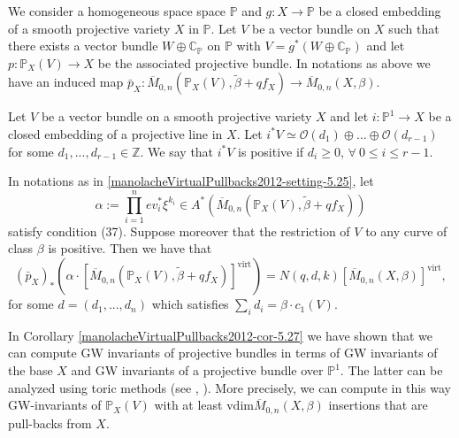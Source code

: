 \begin{setting}\label{manolacheVirtualPullbacks2012-setting-5.25}
\label{manolacheVirtualPullbacks2012-notatii}We consider a homogeneous space space $\mathbb{P}$ and $g:X\to\mathbb{P}$ be a closed embedding of a smooth projective variety $X$ in $\mathbb{P}$. Let $V$ be a vector bundle on $X$ such that there exists a vector bundle $W\oplus \mathbb{C}_{\mathbb{P}}$ on $\mathbb{P}$ with $V=g^*(W\oplus \mathbb{C}_{\mathbb{P}})$ and let $p:\mathbb{P}_X(V)\to X$ be the associated projective bundle. In notations as above we have an induced map $\bar{p}_X:\overline{M}_{0,n}(\mathbb{P}_{X}(V),\tilde{\beta}+qf_X)\to\overline{M}_{0,n}(X,\beta)$.
\end{setting}

\begin{definition}\label{manolacheVirtualPullbacks2012-def-5.26}
 Let $V$ be a vector bundle on a smooth projective variety $X$ and let $i:\mathbb{P}^1\to X$ be a closed embedding of a projective line in $X$. Let $i^*V\simeq\mathcal{O}(d_1)\oplus...\oplus\mathcal{O}(d_{r-1})$ for some $d_1,...,d_{r-1}\in\mathbb{Z}$. We say that $i^*V$ is positive if $d_i\geq0$, $\forall\ 0\leq i\leq r-1$.
\end{definition}

\begin{corollary}\label{manolacheVirtualPullbacks2012-cor-5.27}
\label{manolacheVirtualPullbacks2012-genbdl} In notations as in \ref{manolacheVirtualPullbacks2012-setting-5.25}, let $$\alpha:=\prod_{i=1}^nev_i^*\xi^{k_i}\in A^*(\overline{M}_{0,n}(\mathbb{P}_X(V),\tilde{\beta}+qf_X))$$ satisfy condition (37). Suppose moreover that the restriction of $V$ to any curve of class $\beta$ is positive. Then we have that $$(\bar{p}_X)_* \left(\alpha\cdot[\overline{M}_{0,n}(\mathbb{P}_X(V),\tilde{\beta}+qf_X)]^{\mathrm{virt}}\right)=N(q,d, k)[\overline{M}_{0,n}(X,\beta)]^{\mathrm{virt}},$$
for some $d=(d_1,...,d_n)$ which satisfies $\sum_id_i=\beta\cdot c_1(V)$.
\end{corollary}

\begin{remark}\label{manolacheVirtualPullbacks2012-rem-5.28}
 In Corollary \ref{manolacheVirtualPullbacks2012-cor-5.27} we have shown that we can compute GW invariants of projective bundles in terms of GW invariants of the base $X$ and GW invariants of a projective bundle over $\mathbb{P}^1$. The latter can be analyzed using toric methods (see \cite{e1}, \cite{e2}). More precisely, we can compute in this way GW-invariants of $\mathbb{P}_X(V)$ with at least $\mathrm{vdim} \overline{M}_{0,n}(X,\beta)$ insertions that are pull-backs from $X$.
\end{remark}

